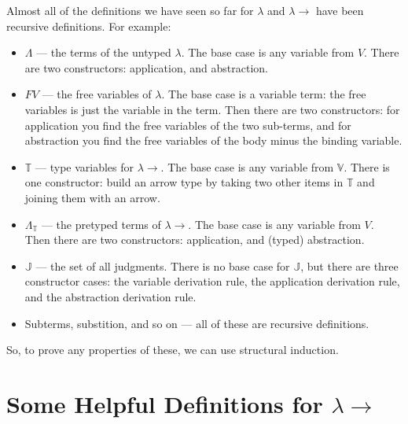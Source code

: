 \documentclass{book}
\numberwithin{equation}{chapter}
\begin{document}
Almost all of the definitions we have seen so far for $\lambda$ and $\lambda\rightarrow$ have been recursive definitions. For example: 

\begin{itemize}

\item{$\Lambda$ --- the terms of the untyped $\lambda$. The base case is any variable from $V$. There are two constructors: application, and abstraction.}

\item{$FV$ --- the free variables of $\lambda$. The base case is a variable term: the free variables is just the variable in the term. Then there are two constructors: for application you find the free variables of the two sub-terms, and for abstraction you find the free variables of the body minus the binding variable.}

\item{$\mathbb{T}$ --- type variables for $\lambda\rightarrow$. The base case is any variable from $\mathbb{V}$. There is one constructor: build an arrow type by taking two other items in $\mathbb{T}$ and joining them with an arrow.}

\item{$\Lambda_{\mathbb{T}}$ --- the pretyped terms of $\lambda\rightarrow$. The base case is any variable from $V$. Then there are two constructors: application, and (typed) abstraction.}

\item{$\mathbb{J}$ --- the set of all judgments. There is no base case for $\mathbb{J}$, but there are three constructor cases: the variable derivation rule, the application derivation rule, and the abstraction derivation rule.}

\item{Subterms, substition, and so on --- all of these are recursive definitions.}

\end{itemize}

\noindent
So, to prove any properties of these, we can use structural induction.


\chapter{Some Helpful Definitions for $\lambda\rightarrow$}
\end{document}
